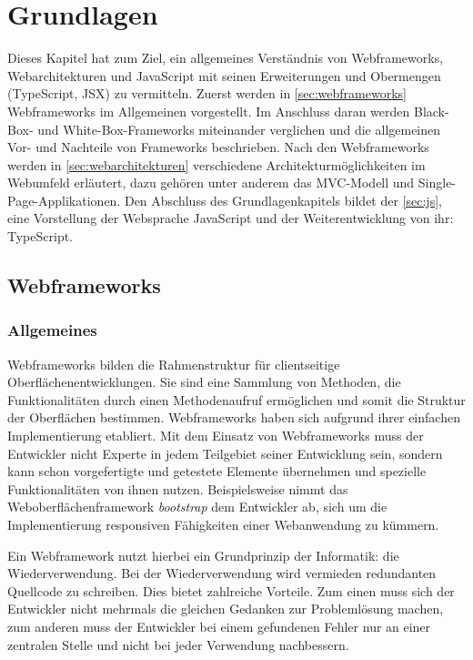 
\chapter{Grundlagen}

Dieses Kapitel hat zum Ziel, ein allgemeines Verständnis von Webframeworks, Webarchitekturen und JavaScript mit seinen Erweiterungen und Obermengen (TypeScript, JSX) zu vermitteln. Zuerst werden in \autoref{sec:webframeworks} Webframeworks im Allgemeinen vorgestellt. Im Anschluss daran werden Black-Box- und White-Box-Frameworks miteinander verglichen und die allgemeinen Vor- und Nachteile von Frameworks beschrieben. Nach den Webframeworks werden in \autoref{sec:webarchitekturen} verschiedene Architekturmöglichkeiten im Webumfeld erläutert, dazu gehören unter anderem das MVC-Modell und Single-Page-Applikationen. Den Abschluss des Grundlagenkapitels bildet der \autoref{sec:js}, eine Vorstellung der Websprache JavaScript und der Weiterentwicklung von ihr: TypeScript. 

\section{Webframeworks}\label{sec:webframeworks}

\subsection{Allgemeines}

Webframeworks bilden die Rahmenstruktur für clientseitige Oberflächenentwicklungen. Sie sind eine Sammlung von Methoden, die Funktionalitäten durch einen Methodenaufruf ermöglichen und somit die Struktur der Oberflächen bestimmen. Webframeworks haben sich aufgrund ihrer einfachen Implementierung etabliert. Mit dem Einsatz von Webframeworks muss der Entwickler nicht Experte in jedem Teilgebiet seiner Entwicklung sein, sondern kann schon vorgefertigte und getestete Elemente übernehmen und spezielle Funktionalitäten von ihnen nutzen. Beispielsweise nimmt das Weboberflächenframework \textit{bootstrap} dem Entwickler ab, sich um die Implementierung responsiven Fähigkeiten einer Webanwendung zu kümmern.\autocites[vgl.][312\psqq]{Schatten2010}

Ein Webframework nutzt hierbei ein Grundprinzip der Informatik: die Wiederverwendung. Bei der Wiederverwendung wird vermieden redundanten Quellcode zu schreiben. Dies bietet zahlreiche Vorteile. Zum einen muss sich der Entwickler nicht mehrmals die gleichen Gedanken zur Problemlösung machen, zum anderen muss der Entwickler bei einem gefundenen Fehler nur an einer zentralen Stelle und nicht bei jeder Verwendung nachbessern.\autocites[vgl.][302\psqq]{Schatten2010}

